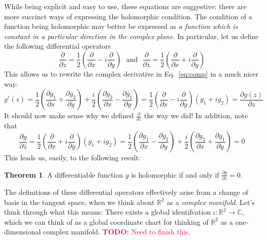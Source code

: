 \documentclass[aps,pra,showpacs,notitlepage,onecolumn,superscriptaddress,nofootinbib]{revtex4-1}
\newcommand{\pop}[1]{\textcolor{crimson}{#1}}
\theoremstyle{definition}
\newtheorem{theorem}{Theorem}[section]
\begin{document}
\noindent While being explicit and easy to use, these equations are suggestive: there are more succinct ways of expressing the holomorphic condition. The condition of a function
being holomorphic may better be expressed as \emph{a function which is constant in a particular direction in the complex plane}. In particular, let us define the following differential
operators
\begin{equation}
  \frac{\partial}{\partial z} = \frac{1}{2} \left( \frac{\partial}{\partial x} - i \frac{\partial}{\partial y} \right) \ \ \ \text{and} \ \ \  \frac{\partial}{\partial \overline{z}} = \frac{1}{2} \left( \frac{\partial}{\partial x} + i \frac{\partial}{\partial y} \right)
\end{equation}
This allows us to rewrite the complex derivative in Eq.~\eqref{eq:comp} in a much nicer way:
\begin{equation}
  g'(z) = \frac{1}{2} \left( \frac{\partial g_1}{\partial x} + \frac{\partial g_2}{\partial y} \right) + \frac{i}{2} \left(  \frac{\partial g_2}{\partial x} - \frac{\partial g_1}{\partial y} \right) = \frac{1}{2} \left( \frac{\partial}{\partial x} - i \frac{\partial}{\partial y} \right) (g_1 + i g_2) = \frac{\partial g(z)}{\partial z}
\end{equation}
It should now make sense why we defined $\frac{\partial}{\partial z}$ the way we did! In addition, note that
\begin{equation}
  \frac{\partial g}{\partial \overline{z}} = \frac{1}{2} \left( \frac{\partial}{\partial x} + i \frac{\partial}{\partial y} \right) (g_1 + i g_2) = \frac{1}{2} \left( \frac{\partial g_1}{\partial x} - \frac{\partial g_2}{\partial y} \right) + \frac{i}{2} \left(  \frac{\partial g_2}{\partial x} + \frac{\partial g_1}{\partial y} \right) = 0
\end{equation}
This leads us, easily, to the following result:
\begin{theorem}
  A differentiable function $g$ is holomorphic if and only if $\frac{\partial g}{\partial \overline{z}} = 0$.
  \end{theorem}
The definitions of these differential operators effectively arise from a change of basis in the tangent space, when we think about $\mathbb{R}^2$ as a \emph{complex manifold}. Let's think through what this means: There exists a global
identifcation $\iota : \mathbb{R}^2 \rightarrow \mathbb{C}$, which we can think of as a global coordinate chart for thinking of $\mathbb{R}^2$ as a one-dimensional complex manifold. \pop{\textbf{TODO:} Need to finish this}.
\end{document}
